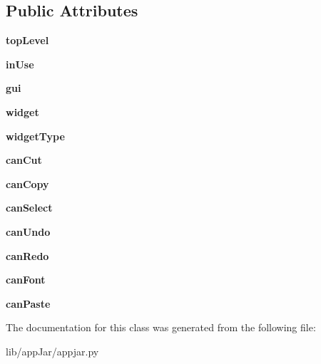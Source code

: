 \subsection*{Public Attributes}
\begin{DoxyCompactItemize}
\item 
\mbox{\label{classappjar_1_1_copy_and_paste_afccbf90527718f143253778f8f818927}} 
{\bfseries top\+Level}
\item 
\mbox{\label{classappjar_1_1_copy_and_paste_ae7c2307b33c891fd5d9433f746aa7f07}} 
{\bfseries in\+Use}
\item 
\mbox{\label{classappjar_1_1_copy_and_paste_aae01be9bf571f7362700bc3036003464}} 
{\bfseries gui}
\item 
\mbox{\label{classappjar_1_1_copy_and_paste_a1587191c33c0c3dfc998b7b3024e9cc7}} 
{\bfseries widget}
\item 
\mbox{\label{classappjar_1_1_copy_and_paste_a5fcbfe270e7e7e65a1e2f25046320db9}} 
{\bfseries widget\+Type}
\item 
\mbox{\label{classappjar_1_1_copy_and_paste_a9b5e6d24ab02094cc1cbf97ceed532a8}} 
{\bfseries can\+Cut}
\item 
\mbox{\label{classappjar_1_1_copy_and_paste_ae564017ee5d6cf47b1f64571f9ca18af}} 
{\bfseries can\+Copy}
\item 
\mbox{\label{classappjar_1_1_copy_and_paste_a20f32d7341fb2edc3aed83bc3da0b81b}} 
{\bfseries can\+Select}
\item 
\mbox{\label{classappjar_1_1_copy_and_paste_a39067f4867e3fa08f3a32bdcc987d8ff}} 
{\bfseries can\+Undo}
\item 
\mbox{\label{classappjar_1_1_copy_and_paste_a0dd3399994d25c9c63f40c189f116db9}} 
{\bfseries can\+Redo}
\item 
\mbox{\label{classappjar_1_1_copy_and_paste_ac9606580c3df11182e72c737d34c9404}} 
{\bfseries can\+Font}
\item 
\mbox{\label{classappjar_1_1_copy_and_paste_a5c033c9a6969fb456b6f822bf510ad00}} 
{\bfseries can\+Paste}
\end{DoxyCompactItemize}


The documentation for this class was generated from the following file\+:\begin{DoxyCompactItemize}
\item 
lib/app\+Jar/appjar.\+py\end{DoxyCompactItemize}
